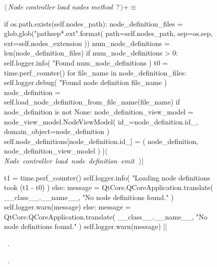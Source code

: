 \documentclass[%
    a4paper,    %
    justified,  %
    nobib,      %
    openany     %
]{tufte-book}
\begin{document}
\begin{figure}
\begin{flushleft} \small
\begin{minipage}{\linewidth}\label{scrap123}\raggedright\small
{} $\langle\,${\itshape Node controller load nodes method}\nobreak\ {\footnotesize {?}}$\,\rangle+\equiv$
\vspace{-1ex}
\begin{pythoncode}

if os.path.exists(self.nodes_path):
    node_definition_files = glob.glob("{path}{sep}*.{ext}".format(
        path=self.nodes_path,
        sep=os.sep,
        ext=self.nodes_extension
    ))
    num_node_definitions = len(node_definition_files)
    if num_node_definitions > 0:
        self.logger.info(
            "Found %
            num_node_definitions
        )
        t0 = time.perf_counter()
        for file_name in node_definition_files:
            self.logger.debug(
                "Found node definition %
                file_name
            )
            node_definition = self.load_node_definition_from_file_name(file_name)
            if node_definition is not None:
                node_definition_view_model = node_view_model.NodeViewModel(
                    id_=node_definition.id_,
                    domain_object=node_definition
                )
                self.node_definitions[node_definition.id_] = (
                    node_definition,
                    node_definition_view_model
                )
                |\hbox{$\langle\,${\itshape Node controller load node definition emit}\nobreak\ {\footnotesize {}}$\,\rangle$}|

        t1 = time.perf_counter()
        self.logger.info(
            "Loading node definitions took %
            (t1 - t0)
        )
    else:
        message = QtCore.QCoreApplication.translate(
            __class__.__name__, "No node definitions found."
        )
        self.logger.warn(message)
else:
    message = QtCore.QCoreApplication.translate(
        __class__.__name__, "No node definitions found."
    )
    self.logger.warn(message)
|\NWsep|
\end{pythoncode}
\vspace{1.5ex}
\footnotesize
\begin{list}{}{\setlength{\itemsep}{-\parsep}\setlength{\itemindent}{-\leftmargin}}
\item \NWtxtMacroDefBy\ .
\item \NWtxtMacroRefIn\ .


\end{list}
\end{minipage}
\end{flushleft}
\end{figure}
\end{document}
